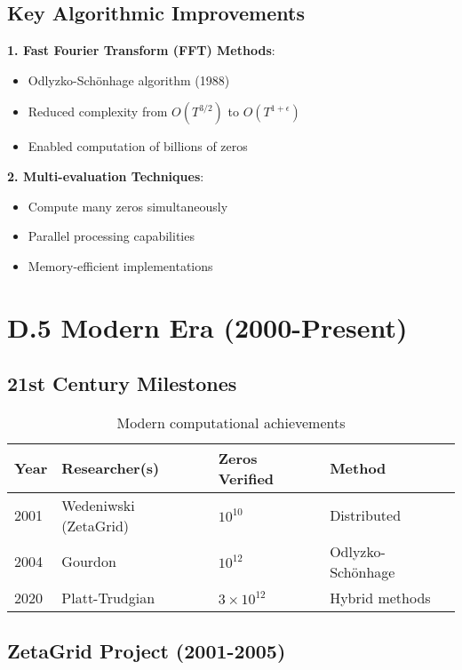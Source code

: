 \subsection{Key Algorithmic Improvements}

\textbf{1. Fast Fourier Transform (FFT) Methods}:
\begin{itemize}
\item Odlyzko-Schönhage algorithm (1988)
\item Reduced complexity from $O(T^{3/2})$ to $O(T^{1+\epsilon})$
\item Enabled computation of billions of zeros
\end{itemize}

\textbf{2. Multi-evaluation Techniques}:
\begin{itemize}
\item Compute many zeros simultaneously
\item Parallel processing capabilities
\item Memory-efficient implementations
\end{itemize}

\section{D.5 Modern Era (2000-Present)}

\subsection{21st Century Milestones}

\begin{table}[h]
\centering
\begin{tabular}{|l|l|l|l|}
\hline
\textbf{Year} & \textbf{Researcher(s)} & \textbf{Zeros Verified} & \textbf{Method} \\
\hline
2001 & Wedeniwski (ZetaGrid) & $10^{10}$ & Distributed \\
2004 & Gourdon & $10^{12}$ & Odlyzko-Schönhage \\
2020 & Platt-Trudgian & $3 \times 10^{12}$ & Hybrid methods \\
\hline
\end{tabular}
\caption{Modern computational achievements}
\end{table}

\subsection{ZetaGrid Project (2001-2005)}

